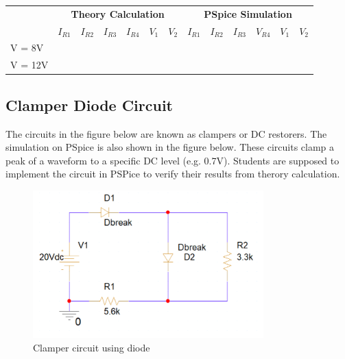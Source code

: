\begin{center}

    \begin{tabular}{l|l|l|l|l|l|l|l|l|l|l|l|l|}
        \cline{2-13}
                                      & \multicolumn{6}{c|}{\textbf{Theory Calculation}} & \multicolumn{6}{c|}{\textbf{PSpice Simulation}}                                                                                                                                                                    \\ \cline{2-13}
                                      & \multicolumn{1}{c|}{$I_{R1}$}                    & \multicolumn{1}{c|}{$I_{R2}$}                   & \multicolumn{1}{c|}{$I_{R3}$} & \multicolumn{1}{c|}{$I_{R4}$} & \multicolumn{1}{c|}{$V_{1}$} & $V_2$ & $I_{R1}$ & $I_{R2}$ & $I_{R3}$ & $V_{R4}$ & $V_1$ & $V_2$ \\ \hline
        \multicolumn{1}{|l|}{V = 8V}  &                                                  &                                                 &                               &                               &                              &       &          &          &          &          &       &       \\ \hline
        \multicolumn{1}{|l|}{V = 12V} &                                                  &                                                 &                               &                               &                              &       &          &          &          &          &       &       \\ \hline
    \end{tabular}

\end{center}

\subsection{Clamper Diode Circuit}
The circuits in the figure below are known as clampers or DC restorers. The simulation on PSpice is also shown in the figure below. These circuits clamp a peak of a waveform to a specific DC level (e.g. 0.7V). Students are supposed to implement the circuit in PSPice to verify their results from therory calculation.
\\
\begin{figure}[!htp]
    \label{pic:halfwave_rectifier1}
    \centering
    \includegraphics[width = 3.5in]{source/picture/bai_2/diode_11.PNG}
    \caption{Clamper circuit using diode}
    \label{lab02_ex031c}
\end{figure}

